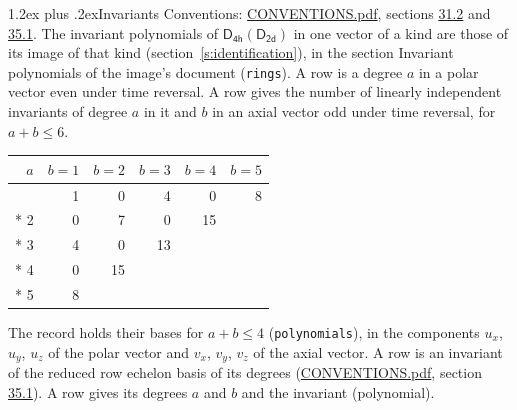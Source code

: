 \documentclass[10pt,a4paper]{article}
\makeatletter
\renewcommand\section{\@startsection{section}{1}{\z@}{-3ex plus -1ex minus -.2ex}%
  {1.2ex plus .2ex}{\normalfont\large\sffamily\bfseries\color{parttitle}}}
\numberwithin{equation}{section}
\newcommand{\grp}[1]{\mathsf{#1}}
\makeatother
\begin{document}
\section{Invariants}\label{s:invariants}
Conventions: \href{../../CONVENTIONS.pdf}{CONVENTIONS.pdf}, sections \href{../../CONVENTIONS.pdf\#conv.31.2}{31.2} and \href{../../CONVENTIONS.pdf\#conv.35.1}{35.1}.
The invariant polynomials of $\grp{D_{4h}}(\grp{D_{2d}})$ in one vector of a kind are those of its image of that kind (section~\ref{s:identification}), in the section Invariant polynomials of the image's document (\texttt{rings}).
\leavevmode\label{n:index.degree.polar}\label{n:index.degree.axial}A row is a degree $a$ in a polar vector even under time reversal. A row gives the number of linearly independent invariants of degree $a$ in it and $b$ in an axial vector odd under time reversal, for $a + b \le 6$.
{\small\begin{longtable}{@{}rrrrrr@{}}\toprule
$a$ & $b = 1$ & $b = 2$ & $b = 3$ & $b = 4$ & $b = 5$\\\midrule\endhead
\bottomrule\endfoot\endlastfoot
1 & 1 & 0 & 4 & 0 & 8\\*
2 & 0 & 7 & 0 & 15 & \\*
3 & 4 & 0 & 13 &  & \\*
4 & 0 & 15 &  &  & \\*
5 & 8 &  &  &  & \\
\bottomrule\end{longtable}}
\leavevmode\label{n:local.component.polar}\label{n:local.component.axial}The record holds their bases for $a + b \le 4$ (\texttt{polynomials}), in the components $u_{x}$, $u_{y}$, $u_{z}$ of the polar vector and $v_{x}$, $v_{y}$, $v_{z}$ of the axial vector. \label{n:head.polynomial}A row is an invariant of the reduced row echelon basis of its degrees (\href{../../CONVENTIONS.pdf}{CONVENTIONS.pdf}, section \href{../../CONVENTIONS.pdf\#conv.35.1}{35.1}). A row gives its degrees $a$ and $b$ and the invariant (polynomial).
\end{document}
